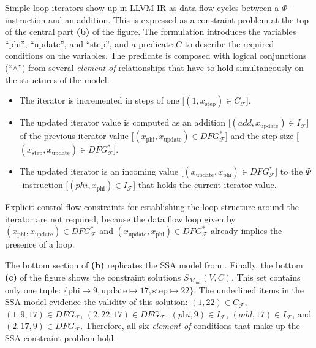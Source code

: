     Simple loop iterators show up in LLVM IR as data flow cycles between a
    $\Phi$-instruction and an addition.
    This is expressed as a constraint problem at the top of the central part
    {\bf(b)} of the figure.
    The formulation introduces the variables
    ``phi'', ``update'', and ``step'', and a predicate $C$ to describe the
    required conditions on the variables.
    The predicate is composed with logical conjunctions (``$\land$'') from
    several {\em element-of} relationships that have to hold simultaneously on
    the structures of the model:
    \begin{itemize}
        \item The iterator is incremented in steps of one
              [$(1,x_\text{step})\in C_\mathcal{F}$].
        \item The updated iterator value is computed as an addition
              [$(add,x_\text{update})\in I_\mathcal{F}$] of the previous
              iterator value
              [$(x_\text{phi},x_\text{update})\in DFG_\mathcal{F}^*$] and the
              step size
              [$(x_\text{step},x_\text{update})\in DFG_\mathcal{F}^*$].
        \item The updated iterator is an incoming value
              [$(x_\text{update},x_\text{phi})\in DFG_\mathcal{F}^*$] to the
              $\Phi$-instruction [$(phi,x_\text{phi})\in I_\mathcal{F}$] that
              holds the current iterator value.
    \end{itemize}
    Explicit control flow constraints for establishing the loop structure around
    the iterator are not required, because the data flow loop given by
    $(x_\text{phi},x_\text{update})\in DFG_\mathcal{F}^*$ and
    $(x_\text{update},x_\text{phi})\in DFG_\mathcal{F}^*$ already implies
    the presence of a loop.

    The bottom section of  {\bf(b)} replicates the
    SSA model from .
    Finally, the bottom {\bf(c)} of the figure shows the constraint solutions
    $S_{M_{dot}}(V,C)$.
    This set contains only one tuple:
    $\{\text{phi}\mapsto9,\text{update}\mapsto17,\text{step}\mapsto22\}$.
    The underlined items in the SSA model evidence the validity of this
    solution:
    $(1,22)\in C_\mathcal F$, $(1,9,17)\in DFG_\mathcal F$,
    $(2,22,17)\in DFG_\mathcal F$, \mbox{$(\textit{phi},9)\in I_\mathcal F$},
    $(\textit{add},17)\in I_\mathcal F$, and $(2,17,9)\in DFG_\mathcal F$.
    Therefore, all six {\it element-of} conditions that make up the SSA
    constraint problem hold.

